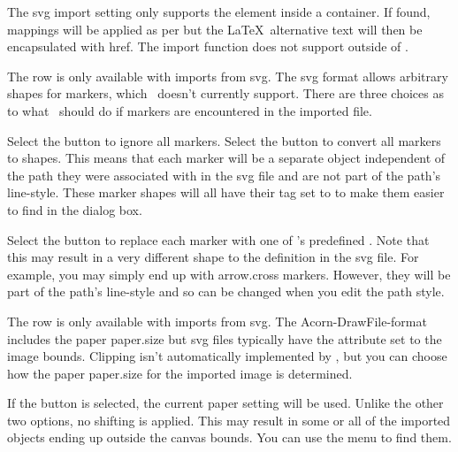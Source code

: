 The \gls{svg} import setting only supports the  element
inside a  container. If found, mappings will be
applied as per  but the \LaTeX\ alternative text will
then be encapsulated with \gls{href}. The import function does not
support  outside of .


The  row is only available with imports from
\gls{svg}. The \gls{svg} format allows arbitrary shapes for markers,
which \FlowframTk\ doesn't currently support. There are three
choices as to what \FlowframTk\ should do if markers are encountered
in the imported file.

Select the  button to ignore all
markers. Select the 
button to convert all markers to \glspl{shape}. This means that each
marker will be a separate \gls{object} independent of the path they
were associated with in the \gls{svg} file and are not part of the
path's \gls{line-style}. These marker shapes will all have their tag
set to  to make them easier to find in the
 dialog box. 

Select the  button
to replace each marker with one of \FlowframTk's predefined 
. Note that this may result in a very different
shape to the definition in the \gls{svg} file. For example, you may
simply end up with \gls{arrow.cross} markers. However, they will be
part of the path's \gls{line-style} and so can be changed when you
edit the path style.


The  row is only available with imports from
\gls{svg}. The \gls{Acorn-DrawFile-format} includes the paper \gls{paper.size}
but \gls{svg} files typically have the  attribute
set to the image bounds. Clipping isn't automatically implemented by \FlowframTk,
but you can choose how the paper \gls{paper.size} for the imported image is
determined.


If the  button is selected, the current
paper setting will be used. Unlike the other two options, no
shifting is applied. This may result in some or all of the
imported \glspl{object} ending up outside the \gls{canvas} bounds.
You can use the  menu to find them.

